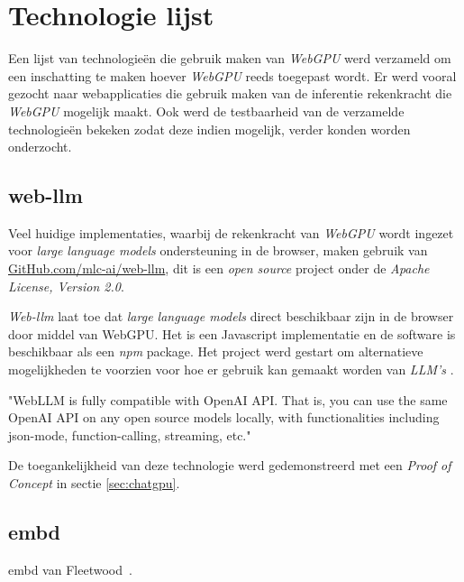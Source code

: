 \chapter{Technologie lijst}
\label{ch:technologylist}

Een lijst van technologieën die gebruik maken van \textit{WebGPU} werd verzameld om een inschatting te maken hoever \textit{WebGPU} reeds toegepast wordt. Er werd vooral gezocht naar webapplicaties die gebruik maken van de inferentie rekenkracht die \textit{WebGPU} mogelijk maakt. Ook werd de testbaarheid van de verzamelde technologieën bekeken zodat deze indien mogelijk, verder konden worden onderzocht.

\section{web-llm}

Veel huidige implementaties, waarbij de rekenkracht van \textit{WebGPU} wordt ingezet voor \textit{large language models} ondersteuning in de browser, maken gebruik van \href{https://github.com/mlc-ai/web-llm}{GitHub.com/mlc-ai/web-llm}, dit is een \textit{open source} project onder de \textit{Apache License, Version 2.0}.

\bigbreak{}

\textit{Web-llm} laat toe dat \textit{large language models} direct beschikbaar zijn in de browser door middel van WebGPU. Het is een Javascript implementatie en de software is beschikbaar als een \textit{npm} package. Het project werd gestart om alternatieve mogelijkheden te voorzien voor hoe er gebruik kan gemaakt worden van \textit{LLM's} \autocite{mlcai2024}.

\begin{displayquote}
    "WebLLM is fully compatible with OpenAI API. That is, you can use the same OpenAI API on any open source models locally, with functionalities including json-mode, function-calling, streaming, etc."
\end{displayquote}

De toegankelijkheid van deze technologie werd gedemonstreerd met een \textit{Proof of Concept} in sectie \ref{sec:chatgpu}.

\break{}

\section{embd}

embd van Fleetwood~\autocite{Fleetwood2023c}.

